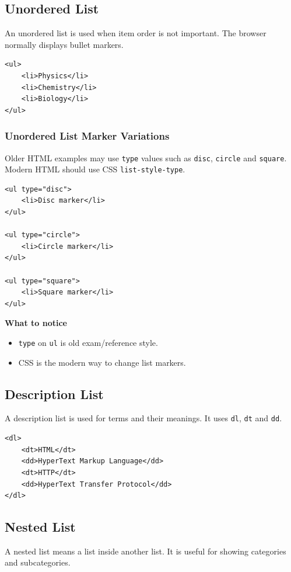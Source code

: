 \subsection{Unordered List}
An unordered list is used when item order is not important. The browser normally displays bullet markers.

\begin{lstlisting}[style=htmlide, caption={Unordered List}]
<ul>
    <li>Physics</li>
    <li>Chemistry</li>
    <li>Biology</li>
</ul>
\end{lstlisting}

\subsubsection{Unordered List Marker Variations}
Older HTML examples may use \texttt{type} values such as \texttt{disc}, \texttt{circle} and \texttt{square}. Modern HTML should use CSS \texttt{list-style-type}.

\begin{lstlisting}[style=htmlide, caption={Unordered List Marker Types}]
<ul type="disc">
    <li>Disc marker</li>
</ul>

<ul type="circle">
    <li>Circle marker</li>
</ul>

<ul type="square">
    <li>Square marker</li>
</ul>
\end{lstlisting}

\textbf{What to notice}
\begin{itemize}
    \item \texttt{type} on \texttt{ul} is old exam/reference style.
    \item CSS is the modern way to change list markers.
\end{itemize}

\subsection{Description List}
A description list is used for terms and their meanings. It uses \texttt{dl}, \texttt{dt} and \texttt{dd}.

\begin{lstlisting}[style=htmlide, caption={Description List}]
<dl>
    <dt>HTML</dt>
    <dd>HyperText Markup Language</dd>
    <dt>HTTP</dt>
    <dd>HyperText Transfer Protocol</dd>
</dl>
\end{lstlisting}

\subsection{Nested List}
A nested list means a list inside another list. It is useful for showing categories and subcategories.

